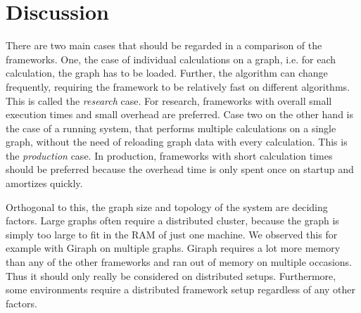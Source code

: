 
\section{Discussion}
There are two main cases that should be regarded in a comparison of the frameworks. 
One, the case of individual calculations on a graph, i.e. for each calculation, the graph has to be loaded. 
Further, the algorithm can change frequently, requiring the framework to be relatively fast on different algorithms.
This is called the \emph{research} case.
For research, frameworks with overall small execution times and small overhead are preferred.
Case two on the other hand is the case of a running system, that performs multiple calculations on a single graph, without the need of reloading graph data with every calculation. This is the \emph{production} case.
In production, frameworks with short calculation times should be preferred because the overhead time is only spent once on startup and amortizes quickly.

Orthogonal to this, the graph size and topology of the system are deciding factors. Large graphs often require a distributed cluster, because the graph is simply too large to fit in the RAM of just one machine. We observed this for example with Giraph on multiple graphs.
Giraph requires a lot more memory than any of the other frameworks and ran out of memory on multiple occasions. 
Thus it should only really be considered on distributed setups.
Furthermore, some environments require a distributed framework setup regardless of any other factors.

